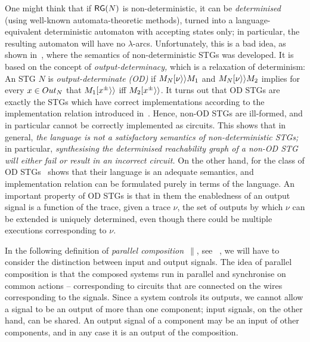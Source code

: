 One might think that if $\mathsf{RG}(N)$ is non-deterministic, it can be \emph{determinised} (using well-known auto\-ma\-ta-the\-o\-re\-tic methods), \ie turned  into a language-equivalent deterministic
automaton with accepting states only; in particular, the resulting automaton will have no $\lambda$-arcs. Unfortunately, this is a bad idea, as shown in~\cite{KSV-08}, where the semantics of non-deterministic STGs was developed. It is based on the concept of \emph{output-determinacy,} which is a relaxation of determinism: An STG $N$ is \emph{output-determinate (OD)} if $M_N [\nu\rangle\rangle
M_1$ and $M_N [\nu\rangle\rangle M_2$ implies for every $x\in \Ot_N$ that
$M_1 [x^\pm\rangle\rangle$ iff $M_2 [x^\pm\rangle\rangle$.
It turns out that OD STGs are exactly the STGs which
have correct implementations according to the implementation relation introduced in~\cite{KSV-08}.
Hence, non-OD STGs are ill-formed, and in particular cannot be correctly implemented as
circuits. This shows that in general, \emph{the language is not a satisfactory semantics of
non-deterministic STGs;} in particular, \emph{synthesising the determinised reachability graph of a non-OD STG
will either fail or result in an incorrect circuit.} On the other hand, for the class of OD STGs~\cite{KSV-08} shows that their language
is an adequate semantics, and
implementation relation can be formulated purely in terms of the language.
An important property of OD STGs is that in them the enabledness of an output signal is a function of the trace, \ie given a trace $\nu$, the set of outputs by which $\nu$ can be extended is uniquely determined, even though there could be multiple executions corresponding to $\nu$.


\smallskip

In the following definition
of {\em parallel composition}~$\parallel$, see \eg~\cite{vowo02lncs}, we will have to
consider the distinction between input and output signals.
The idea of parallel composition is that the
composed systems run in parallel and synchronise on common actions
-- corresponding to circuits that are connected on the
wires corresponding to the signals.
Since a system controls its outputs, we cannot allow a signal to
be an output of more than one component; input signals, on the other
hand, can be shared.
An output signal of a component may be an input of
other components, and in any case it is an output of the composition.


